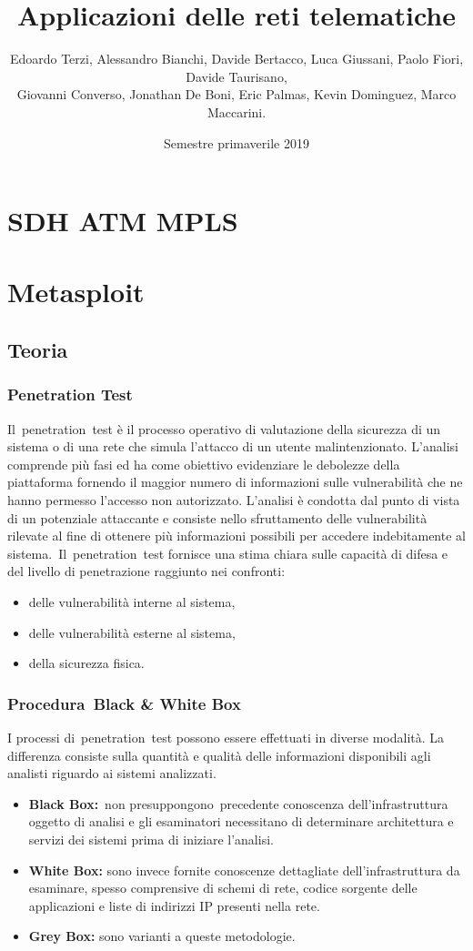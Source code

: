 \documentclass{article}
\title{\Huge Applicazioni delle reti telematiche \vspace{1cm}}
\author{Edoardo Terzi, Alessandro Bianchi, Davide Bertacco, Luca Giussani, Paolo Fiori, Davide Taurisano, \\
Giovanni Converso, Jonathan De Boni, Eric Palmas, Kevin Dominguez, Marco Maccarini.\vspace{0.5cm}}
\date{Semestre primaverile 2019}
\begin{document}
\maketitle
\thispagestyle{empty}
\pagebreak

\tableofcontents
\lstset{language=C++}
\pagebreak

\section{SDH ATM MPLS}

\section{Metasploit}
\subsection{Teoria}
\subsubsection{Penetration Test}
Il penetration test è il processo operativo di valutazione della sicurezza di un sistema o di una rete che 
simula l'attacco di un utente malintenzionato. L'analisi comprende più fasi ed ha come obiettivo evidenziare 
le debolezze della piattaforma fornendo il maggior numero di informazioni sulle vulnerabilità che ne hanno 
permesso l'accesso non autorizzato. L'analisi è condotta dal punto di vista di un potenziale attaccante e 
consiste nello sfruttamento delle vulnerabilità rilevate al fine di ottenere più informazioni possibili 
per accedere indebitamente al sistema. Il penetration test fornisce una stima chiara sulle capacità di 
difesa e del livello di penetrazione raggiunto nei confronti: 
\begin{itemize}
    \item delle vulnerabilità interne al sistema,
    \item delle vulnerabilità esterne al sistema,
    \item della sicurezza fisica.
\end{itemize}
\subsubsection{Procedura Black \& White Box}
I processi di penetration test possono essere effettuati in diverse modalità. La differenza consiste 
sulla quantità e qualità delle informazioni disponibili agli analisti riguardo ai sistemi analizzati.
\begin{itemize}
    \item \textbf{Black Box:} non presuppongono precedente conoscenza dell'infrastruttura oggetto di analisi 
    e gli esaminatori necessitano di determinare architettura e servizi dei sistemi prima di iniziare l'analisi.
    \item \textbf{White Box:} sono invece fornite conoscenze dettagliate dell'infrastruttura da esaminare, 
    spesso comprensive di schemi di rete, codice sorgente delle applicazioni e liste di indirizzi IP presenti nella rete.
    \item \textbf{Grey Box:} sono varianti a queste metodologie.
\end{itemize}
\end{document}
